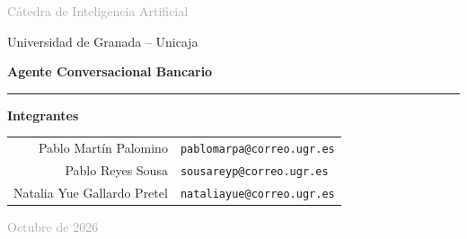 \begin{titlepage}

\centering

\vspace*{0.8cm}

\begin{minipage}{0.42\textwidth}
    \centering
    \logoUGR
\end{minipage}
\hfill
\begin{minipage}{0.42\textwidth}
    \centering
    \logoUnicaja
\end{minipage}

\vspace{2.5cm}

{\large
\textcolor{darkgray}{
Cátedra de Inteligencia Artificial
}
}

\vspace{0.3cm}

{\normalsize
Universidad de Granada -- Unicaja
}

\vspace{1.5cm}

{\Huge
\textbf{Agente Conversacional Bancario}
}

\vspace{0.8cm}

\textcolor{ugrred}{\rule{0.55\textwidth}{1.2pt}}

\vspace{2.5cm}

{\large
\textbf{Integrantes}
}

\vspace{0.8cm}

\begin{tabular}{rl}
    Pablo Martín Palomino
        & \texttt{pablomarpa@correo.ugr.es} \\[0.35cm]

    Pablo Reyes Sousa
        & \texttt{sousareyp@correo.ugr.es} \\[0.35cm]

    Natalia Yue Gallardo Pretel
        & \texttt{nataliayue@correo.ugr.es}
\end{tabular}

\vfill

{\normalsize
\textcolor{darkgray}{Octubre de 2026}
}

\end{titlepage}